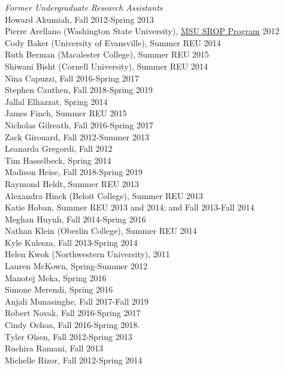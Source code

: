 \documentclass[9pt]{extarticle}
\begin{document}
\emph{Former Undergraduate Research Assistants} \\
\vspace{1pt}
Howard Akumiah, Fall 2012-Spring 2013 \\
Pierre Arellano (Washington State University), \href{http://grad.msu.edu/srop/}{MSU SROP Program} 2012 \\
Cody Baker (University of Evansville), Summer REU 2014 \\
Ruth Berman (Macalester College), Summer REU 2015 \\
Shiwani Bisht (Cornell University), Summer REU 2014 \\
Nina Capuzzi, Fall 2016-Spring 2017 \\
Stephen Cauthen, Fall 2018-Spring 2019 \\
Jallal Elhazzat, Spring 2014 \\
James Finch, Summer REU 2015 \\
Nicholas Gilreath, Fall 2016-Spring 2017 \\
Zack Girouard, Fall 2012-Summer 2013 \\
Leanarda Gregordi, Fall 2012 \\
Tim Hasselbeck, Spring 2014 \\
Madison Heise, Fall 2018-Spring 2019 \\
Raymond Heldt, Summer REU 2013 \\
Alexandra Hinck (Beloit College), Summer REU 2013 \\
Katie Hoban, Summer REU 2013 and 2014; and Fall 2013-Fall 2014 \\
Meghan Huynh, Fall 2014-Spring 2016 \\
Nathan Klein (Oberlin College), Summer REU 2014 \\
Kyle Kulesza, Fall 2013-Spring 2014 \\
Helen Kwok (Northwestern University), 2011 \\
Lauren McKown, Spring-Summer 2012 \\
Manotej Meka, Spring 2016 \\
Simone Merendi, Spring 2016 \\
Anjali Munasinghe, Fall 2017-Fall 2019 \\
Robert Novak, Fall 2016-Spring 2017 \\
Cindy Ochoa, Fall 2016-Spring 2018. \\
Tyler Olsen, Fall 2012-Spring 2013 \\
Ruchira Ramani, Fall 2013 \\
Michelle Rizor, Fall 2012-Spring 2014 \\
\end{document}
